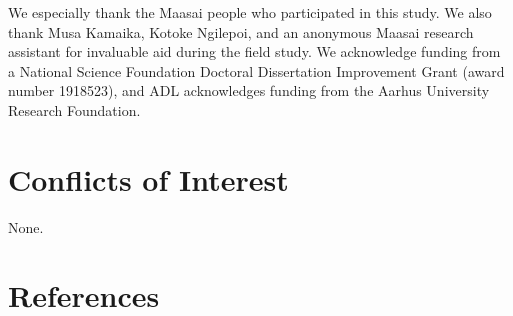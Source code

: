 \documentclass[
]{article}
\begin{document}
We especially thank the Maasai people who participated in this study. We also thank Musa Kamaika, Kotoke Ngilepoi, and an anonymous Maasai research assistant for invaluable aid during the field study. We acknowledge funding from a National Science Foundation Doctoral Dissertation Improvement Grant (award number 1918523), and ADL acknowledges funding from the Aarhus University Research Foundation.

\section*{Conflicts of Interest}

None.

\section*{References}
\end{document}
